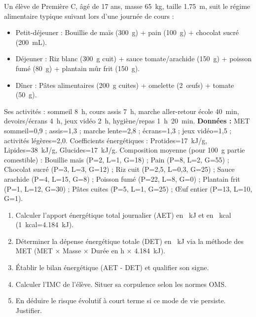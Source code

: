 \documentclass[11pt]{article}
\begin{document}
\begin{exercice}
Un élève de Première C, âgé de 17 ans, masse \SI{65}{kg}, taille \SI{1,75}{m}, suit le régime alimentaire typique suivant lors d'une journée de cours : 
\begin{itemize}
    \item Petit-déjeuner : Bouillie de maïs (\SI{300}{g}) + pain (\SI{100}{g}) + chocolat sucré (\SI{200}{mL}).
    \item Déjeuner : Riz blanc (\SI{300}{g} cuit) + sauce tomate/arachide (\SI{150}{g}) + poisson fumé (\SI{80}{g}) + plantain mûr frit (\SI{150}{g}).
    \item Dîner : Pâtes alimentaires (\SI{200}{g} cuites) + omelette (\SI{2}{œufs}) + tomate (\SI{50}{g}).
\end{itemize}
Ses activités : sommeil \SI{8}{h}, cours assis \SI{7}{h}, marche aller-retour école \SI{40}{min}, devoirs/écrans \SI{4}{h}, jeux vidéo \SI{2}{h}, hygiène/repas \SI{1}{h}~20~min.
\textbf{Données :} MET sommeil=0,9 ; assis=1,3 ; marche lente=2,8 ; écrans=1,3 ; jeux vidéo=1,5 ; activités légères=2,0. Coefficients énergétiques : Protides=\SI{17}{kJ/g}, Lipides=\SI{38}{kJ/g}, Glucides=\SI{17}{kJ/g}. Composition moyenne (pour \SI{100}{g} partie comestible) : Bouillie maïs (P=2, L=1, G=18) ; Pain (P=8, L=2, G=55) ; Chocolat sucré (P=3, L=3, G=12) ; Riz cuit (P=2,5, L=0,3, G=25) ; Sauce arachide (P=4, L=15, G=8) ; Poisson fumé (P=22, L=8, G=0) ; Plantain frit (P=1, L=12, G=30) ; Pâtes cuites (P=5, L=1, G=25) ; Œuf entier (P=13, L=10, G=1).
\begin{enumerate}
    \item Calculer l'apport énergétique total journalier (AET) en \SI{}{kJ} et en \SI{}{kcal} (\SI{1}{kcal}=\SI{4,184}{kJ}).
    \item Déterminer la dépense énergétique totale (DET) en \SI{}{kJ} via la méthode des MET (MET $\times$ Masse $\times$ Durée en h $\times$ \SI{4,184}{kJ}).
    \item Établir le bilan énergétique (AET - DET) et qualifier son signe.
    \item Calculer l'IMC de l'élève. Situer sa corpulence selon les normes OMS.
    \item En déduire le risque évolutif à court terme si ce mode de vie persiste. Justifier.
\end{enumerate}
\end{exercice}
\end{document}

